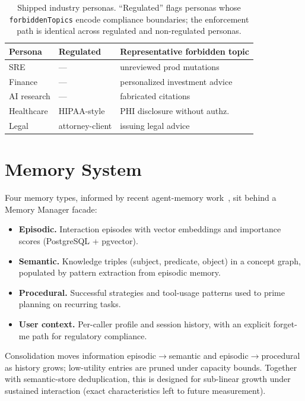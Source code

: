 \documentclass[11pt]{article}
\begin{document}
\begin{table}[t]
  \small
  \centering
  \begin{tabular}{lll}
    \toprule
    Persona & Regulated & Representative forbidden topic \\
    \midrule
    SRE           & --- & unreviewed prod mutations \\
    Finance       & --- & personalized investment advice \\
    AI research   & --- & fabricated citations \\
    Healthcare    & HIPAA-style & PHI disclosure without authz. \\
    Legal         & attorney-client & issuing legal advice \\
    \bottomrule
  \end{tabular}
  \caption{Shipped industry personas. ``Regulated'' flags personas whose \texttt{forbiddenTopics} encode compliance boundaries; the enforcement path is identical across regulated and non-regulated personas.}
  \label{tab:domains}
\end{table}

\section{Memory System}
\label{sec:memory}

Four memory types, informed by recent agent-memory work~\citep{ai2025memorybench, gallego2026memoryastool, yadav2026synapse}, sit behind a Memory Manager facade:

\begin{itemize}
\item \textbf{Episodic.} Interaction episodes with vector embeddings and importance scores (PostgreSQL + pgvector).
\item \textbf{Semantic.} Knowledge triples (subject, predicate, object) in a concept graph, populated by pattern extraction from episodic memory.
\item \textbf{Procedural.} Successful strategies and tool-usage patterns used to prime planning on recurring tasks.
\item \textbf{User context.} Per-caller profile and session history, with an explicit forget-me path for regulatory compliance.
\end{itemize}

Consolidation moves information episodic$\to$semantic and episodic$\to$procedural as history grows; low-utility entries are pruned under capacity bounds. Together with semantic-store deduplication, this is designed for sub-linear growth under sustained interaction (exact characteristics left to future measurement).
\end{document}
